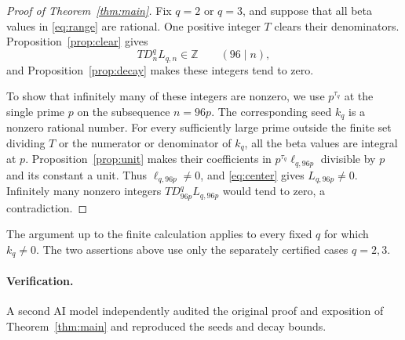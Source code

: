 \documentclass[11pt]{article}
\theoremstyle{remark}
\newcommand{\Z}{\mathbb Z}
\numberwithin{equation}{section}
\begin{document}
\begin{proof}[Proof of Theorem~\ref{thm:main}]
Fix $q=2$ or $q=3$, and suppose that all beta values in
\eqref{eq:range} are rational. One positive integer $T$ clears
their denominators. Proposition~\ref{prop:clear} gives
\[
 T D_n^qL_{q,n}\in\Z\qquad(96\mid n),
\]
and Proposition~\ref{prop:decay} makes these integers tend to zero.

To show that infinitely many of these integers are nonzero, we use
$p^{\tau_q}$ at the single prime $p$ on the subsequence $n=96p$.
The corresponding seed $k_q$ is a nonzero rational number.
For every sufficiently large prime outside the finite set dividing
$T$ or the numerator or denominator of $k_q$, all the beta values
are integral at $p$. Proposition~\ref{prop:unit} makes their
coefficients in $p^{\tau_q}\ell_{q,96p}$ divisible by $p$ and
its constant a unit. Thus $\ell_{q,96p}\ne0$, and
\eqref{eq:center} gives $L_{q,96p}\ne0$. Infinitely many
nonzero integers $T D_{96p}^qL_{q,96p}$ would tend to zero,
a contradiction.
\end{proof}

The argument up to the finite calculation applies to every fixed
$q$ for which $k_q\ne0$. The two assertions above use only the
separately certified cases $q=2,3$.

\paragraph{Verification.}
A second AI model independently audited the original proof and exposition of
Theorem~\ref{thm:main} and reproduced the seeds and decay bounds.
\end{document}
